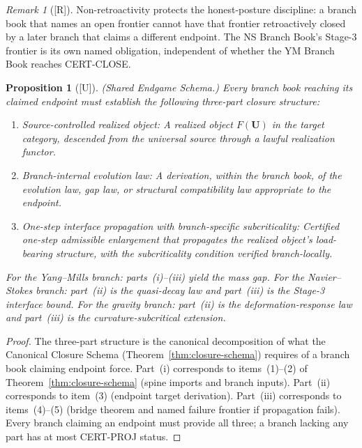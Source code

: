 \documentclass[12pt,oneside]{amsbook}
\theoremstyle{plain}
\newtheorem{proposition}[theorem]{Proposition}
\theoremstyle{definition}
\theoremstyle{remark}
\newtheorem{remark}[theorem]{Remark}
\newcommand{\status}[1]{\textup{[#1]}}
\begin{document}
\begin{remark}[\status{R}]
Non-retroactivity protects the honest-posture discipline: a branch
book that names an open frontier cannot have that frontier
retroactively closed by a later branch that claims a different
endpoint.  The NS Branch Book's Stage-3 frontier is its own named
obligation, independent of whether the YM Branch Book reaches
CERT-CLOSE.
\end{remark}


\begin{proposition}[\status{U}]\label{prop:shared-endgame}
\textup{(Shared Endgame Schema.)}  Every branch book reaching its
claimed endpoint must establish the following three-part closure
structure:
\begin{enumerate}[label=\textup{(\roman*)}]
  \item \emph{Source-controlled realized object:}  A realized object
        $F(\mathbf{U})$ in the target category, descended from the
        universal source through a lawful realization functor.
  \item \emph{Branch-internal evolution law:}  A derivation, within
        the branch book, of the evolution law, gap law, or structural
        compatibility law appropriate to the endpoint.
  \item \emph{One-step interface propagation with branch-specific
        subcriticality:}  Certified one-step admissible enlargement
        that propagates the realized object's load-bearing structure,
        with the subcriticality condition verified branch-locally.
\end{enumerate}
For the Yang--Mills branch: parts~(i)--(iii) yield the mass gap.
For the Navier--Stokes branch: part~(ii) is the quasi-decay law and
part~(iii) is the Stage-3 interface bound.
For the gravity branch: part~(ii) is the deformation-response law and
part~(iii) is the curvature-subcritical extension.
\end{proposition}

\begin{proof}
The three-part structure is the canonical decomposition of what the
Canonical Closure Schema (Theorem~\ref{thm:closure-schema}) requires
of a branch book claiming endpoint force.  Part~(i) corresponds to
items~(1)--(2) of Theorem~\ref{thm:closure-schema} (spine imports and
branch inputs).  Part~(ii) corresponds to item~(3) (endpoint target
derivation).  Part~(iii) corresponds to items~(4)--(5) (bridge theorem
and named failure frontier if propagation fails).  Every branch
claiming an endpoint must provide all three; a branch lacking any part
has at most CERT-PROJ status.
\end{proof}
\end{document}
